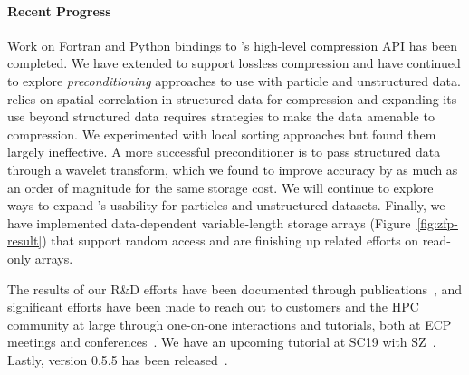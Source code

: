 \paragraph{Recent Progress}

Work on Fortran and Python bindings to {\zfp}'s high-level compression API has been completed.  We have extended {\zfp} to support lossless compression and have continued to explore \emph{preconditioning} approaches to use with particle and unstructured data.  {\zfp} relies on spatial correlation in structured data for compression and expanding its use beyond structured data requires strategies to make the data amenable to compression.  We experimented with local sorting approaches but found them largely ineffective.  A more successful preconditioner is to pass structured data through a wavelet transform, which we found to improve accuracy by as much as an order of magnitude for the same storage cost.  We will continue to explore ways to expand {\zfp}'s usability for particles and unstructured datasets.  Finally, we have implemented data-dependent variable-length storage arrays (Figure~\ref{fig:zfp-result}) that support random access and are finishing up related efforts on read-only arrays.

The results of our R\&D efforts have been documented through publications~\cite{zfp-isc2017,zfp-jsm2017,zfp-sisc2019,zfp-drbsd2019}, and significant efforts have been made to reach out to customers and the HPC community at large through one-on-one interactions and tutorials, both at ECP meetings and conferences~\cite{zfp-isc2017-tut,zfp-sc2017-tut,zfp-ep2018-tut,zfp-sc2018-tut,zfp-isc2019-tut}.  We have an upcoming tutorial at SC19 with SZ~\cite{zfp-sc2019-tut}.  Lastly, {\zfp} version 0.5.5 has been released~\cite{zfp-code}.


